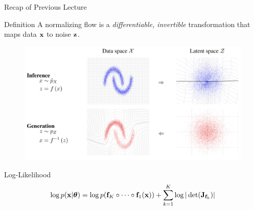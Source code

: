 \documentclass{beamer}
\begin{document}
\begin{frame}{Recap of Previous Lecture}
	\begin{block}{Definition}
		A normalizing flow is a \textit{differentiable, invertible} transformation that maps data $\mathbf{x}$ to noise $\mathbf{z}$. 
	\end{block}
	\vspace{-0.1cm}
	\begin{figure}
		\includegraphics[width=0.85\linewidth]{figs/flows_how2}
	\end{figure}
	\vspace{-0.5cm}
	\begin{block}{Log-Likelihood}
		\vspace{-0.5cm}
		\[
			\log p(\mathbf{x} | \boldsymbol{\theta}) = \log p(\mathbf{f}_K \circ \cdots \circ \mathbf{f}_1(\mathbf{x})) + \sum_{k=1}^K\log |\det (\mathbf{J}_{\mathbf{f}_k})|
		\]
	\end{block}
\end{frame}
\end{document}
